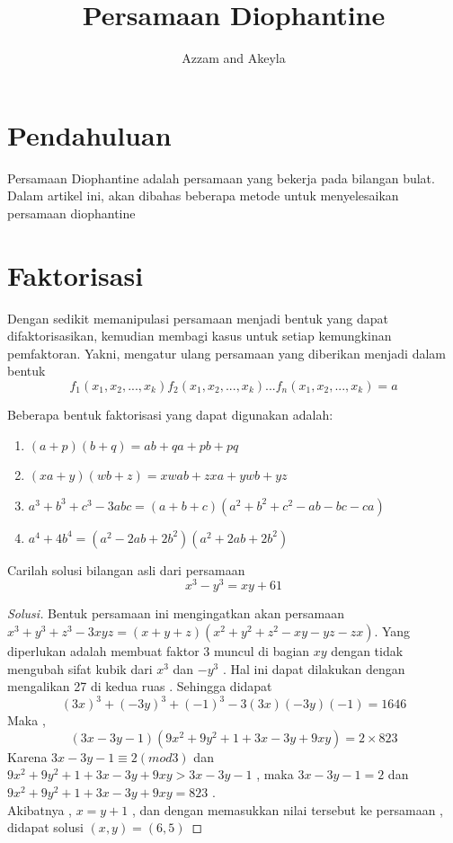 \documentclass[11pt]{scrartcl}
\title{Persamaan Diophantine}
\author{Azzam and Akeyla}
\begin{document}
\maketitle

\renewcommand*\contentsname{Daftar Isi}
\tableofcontents

\newpage

\section{Pendahuluan}
Persamaan Diophantine adalah persamaan yang bekerja pada bilangan bulat. Dalam artikel ini, akan dibahas beberapa metode untuk menyelesaikan persamaan diophantine
\section{Faktorisasi}
Dengan sedikit memanipulasi persamaan menjadi bentuk yang dapat difaktorisasikan, kemudian membagi kasus untuk setiap kemungkinan pemfaktoran. Yakni, mengatur ulang persamaan yang diberikan menjadi dalam bentuk \[f_1(x_1,x_2,...,x_k)f_2(x_1,x_2,...,x_k)...f_n(x_1,x_2,...,x_k) = a\] 

Beberapa bentuk faktorisasi yang dapat digunakan adalah:
\begin{enumerate}
    \item $(a + p)(b + q) = ab + qa + pb + pq$
    \item $(xa + y)(wb + z) = xwab + zxa + ywb + yz$
    \item $a^3 + b^3 + c^3 - 3abc = (a + b + c)(a^2 + b^2 + c^2 - ab - bc - ca)$
    \item $a^4 + 4b^4 = (a^2 - 2ab + 2b^2)(a^2 + 2ab + 2b^2)$
\end{enumerate}

\begin{example}
    Carilah solusi bilangan asli dari persamaan $$x^3-y^3=xy+61$$
\end{example}

\begin{proof}[Solusi]
    Bentuk persamaan ini mengingatkan akan persamaan $x^3+y^3+z^3-3xyz=(x+y+z)(x^2+y^2+z^2-xy-yz-zx)$. Yang diperlukan adalah membuat faktor 3 muncul di bagian $xy$ dengan tidak mengubah sifat kubik dari $x^3$ dan $-y^3$ . Hal ini dapat dilakukan dengan mengalikan 27 di kedua ruas . Sehingga didapat $$(3x)^3+(-3y)^3+(-1)^3-3(3x)(-3y)(-1)=1646$$
    Maka , $$(3x-3y-1)(9x^2+9y^2+1+3x-3y+9xy)=2\times823$$
    Karena $3x-3y-1\equiv 2(mod 3)$ dan $9x^2+9y^2+1+3x-3y+9xy>3x-3y-1$ , maka $3x-3y-1=2$ dan $9x^2+9y^2+1+3x-3y+9xy=823$ . \\
    Akibatnya , $x=y+1$ , dan dengan memasukkan nilai tersebut ke persamaan , didapat solusi $(x,y)=(6,5)$
\end{proof}
\end{document}
